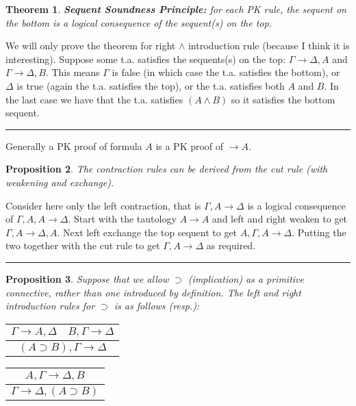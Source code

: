 \documentclass[twoside]{article}
\newcounter{lecnum}
\newtheorem{theorem}{Theorem}[lecnum]
\newtheorem{proposition}[theorem]{Proposition}
\newenvironment{proof}{{\bf Proof:}}{\hfill\rule{2mm}{2mm}}
\begin{document}
\begin{theorem}
\textbf{Sequent Soundness Principle:} for each PK rule, the sequent on the bottom is a logical consequence of the sequent(s) on the top.
\end{theorem}
\begin{proof}
We will only prove the theorem for right $\land$ introduction rule (because I think it is interesting). Suppose some t.a. satisfies the sequents(s) on the top: $\Gamma \rightarrow \Delta, A$ and $\Gamma \rightarrow \Delta, B$. This means $\Gamma$ is false (in which case the t.a. satisfies the bottom), or $\Delta$ is true (again the t.a. satisfies the top), or the t.a. satisfies both $A$ and $B$. In the last case we have that the t.a. satisfies $(A \land B)$ so it satisfies the bottom sequent.  
\end{proof}

Generally a PK proof of formula $A$ is a PK proof of $\rightarrow A$. 

\begin{proposition}
The contraction rules can be derived from the cut rule (with weakening and exchange).
\end{proposition}
\begin{proof}
Consider here only the left contraction, that is $\Gamma, A \rightarrow \Delta$ is a logical consequence of $\Gamma, A, A \rightarrow \Delta$. Start with the tautology $A \rightarrow A$ and left and right weaken to get $\Gamma, A \rightarrow \Delta, A$. Next left exchange the top sequent to get $A, \Gamma, A \rightarrow \Delta$. Putting the two together with the cut rule to get $\Gamma, A \rightarrow \Delta$ as required.  
\end{proof}

\begin{proposition}
Suppose that we allow $\supset$ (implication) as a primitive connective, rather than one introduced by definition. The left and right introduction rules for $\supset$ is as follows (resp.):

\begin{tabular}{c}
$\Gamma \rightarrow A, \Delta \quad B, \Gamma \rightarrow \Delta$ \\
\hline
$(A \supset B), \Gamma \rightarrow \Delta$ \\
\end{tabular}

\begin{tabular}{c}
$A, \Gamma \rightarrow \Delta, B$ \\
\hline
$\Gamma \rightarrow \Delta, (A \supset B)$ \\
\end{tabular}
\end{proposition}
\end{document}
